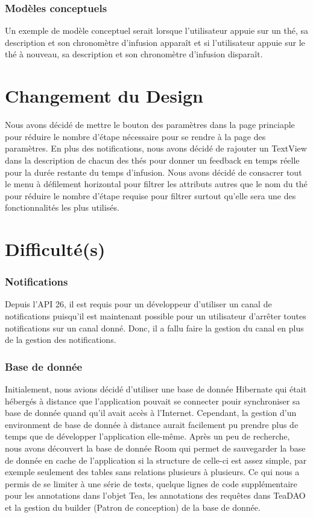 \documentclass[a4paper,12pt]{article}
\begin{document}
\begin{spacing}{1}
	\subsubsection*{Modèles conceptuels}
	Un exemple de modèle conceptuel serait lorsque l'utilisateur appuie sur un thé, sa description et son chronomètre d'infusion apparaît et si l'utilisateur appuie sur le thé à nouveau, sa description et son chronomètre d'infusion disparaît.
	\section*{Changement du Design}
	Nous avons décidé de mettre le bouton des paramètres dans la page princiaple pour réduire le nombre d'étape nécessaire pour se rendre à la page des paramètres. En plus des notifications, nous avons décidé de rajouter un TextView dans la description de chacun des thés pour donner un feedback en temps réelle pour la durée restante du temps d'infusion. Nous avons décidé de consacrer tout le menu à défilement horizontal pour filtrer les attributs autres que le nom du thé pour réduire le nombre d'étape requise pour filtrer surtout qu'elle sera une des fonctionnalités les plus utilisés.
	\section*{Difficulté(s)}
	\subsubsection*{Notifications}
	Depuis l'API 26, il est requis pour un développeur d'utiliser un canal de notifications puisqu'il est maintenant possible pour un utilisateur d'arrêter toutes notifications sur un canal donné. Donc, il a fallu faire la gestion du canal en plus de la gestion des notifications.
	\subsubsection*{Base de donnée}
	Initialement, nous avions décidé d'utiliser une base de donnée Hibernate qui était hébergés à distance que l'application pouvait se connecter pouir synchroniser sa base de donnée quand qu'il avait accès à l'Internet. Cependant, la gestion d'un environment de base de donnée à distance aurait facilement pu prendre plus de temps que de développer l'application elle-même. Après un peu de recherche, nous avons découvert la base de donnée Room qui permet de sauvegarder la base de donnée en cache de l'application si la structure de celle-ci est assez simple, par exemple seulement des tables sans relations plusieurs à plusieurs. Ce qui nous a permis de se limiter à une série de tests, quelque lignes de code supplémentaire pour les annotations dans l'objet Tea, les annotations des requêtes dans TeaDAO et la gestion du builder (Patron de conception) de la base de donnée.

\end{spacing}
\end{document}
